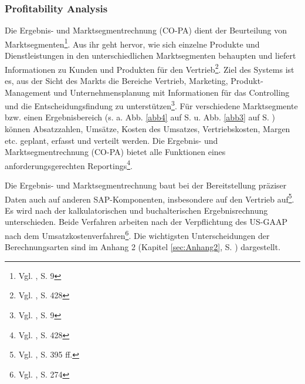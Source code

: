 \subsubsection{Profitability Analysis} %
Die Ergebnis- und Marktsegmentrechnung (CO-PA) dient der Beurteilung von Marktsegmenten\footnote{Vgl. \cite{SAPCOPA2001}, S. 9}.
Aus ihr geht hervor, wie sich einzelne Produkte und Dienstleistungen in den unterschiedlichen Marktsegmenten behaupten und liefert Informationen zu Kunden und Produkten für den Vertrieb\footnote{Vgl. \cite{Patel2009}, S. 428}.
Ziel des Systems ist es, aus der Sicht des Markts die Bereiche Vertrieb, Marketing, Produkt-Management und Unternehmensplanung mit Informationen für das Controlling und die Entscheidungsfindung zu unterstützen\footnote{Vgl. \cite{SAPCOPA2001}, S. 9}.
Für verschiedene Marktsegmente bzw. einen Ergebnisbereich (s. a. Abb. \ref{abb4} auf S. \pageref{abb4} u. Abb. \ref{abb3} auf S. \pageref{abb3}) können Absatzzahlen, Umsätze, Kosten des Umsatzes, Vertriebskosten, Margen etc. geplant, erfasst und verteilt werden. Die Ergebnis- und Marktsegmentrechnung (CO-PA) bietet alle Funktionen eines anforderungsgerechten Reportings\footnote{Vgl. \cite{Patel2009}, S. 428}.

Die Ergebnis- und Marktsegmentrechnung baut bei der Bereitstellung präziser Daten auch auf anderen SAP-Komponenten, insbesondere auf den Vertrieb auf\footnote{Vgl. \cite{Patel2009}, S. 395 ff.}. Es wird nach der kalkulatorischen und buchalterischen Ergebnisrechnung unterschieden. Beide Verfahren arbeiten nach der Verpflichtung des US-GAAP nach dem Umsatzkostenverfahren\footnote{Vgl. \cite{Klein2010}, S. 274}. Die wichtigsten Unterscheidungen der Berechnungsarten sind im Anhang 2 (Kapitel \ref{sec:Anhang2}, S. \pageref{sec:Anhang2}) dargestellt.
